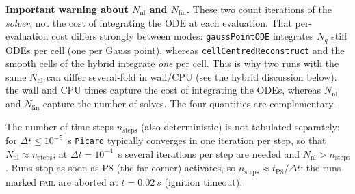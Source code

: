 \documentclass[11pt,a4paper]{article}
\newcommand{\code}[1]{\texttt{\small #1}}
\begin{document}
\noindent\textbf{Important warning about $N_{\mathrm{nl}}$ and $N_{\mathrm{lin}}$.}
These two count iterations of the \emph{solver}, not the cost of integrating the ODE at
each evaluation. That per-evaluation cost differs strongly between modes:
\code{gaussPointODE} integrates $N_q$ stiff ODEs per cell (one per Gauss point),
whereas \code{cellCentredReconstruct} and the smooth cells of the hybrid integrate
\emph{one} per cell. This is why two runs with the same $N_{\mathrm{nl}}$ can
differ several-fold in wall/CPU (see the hybrid discussion below): the
wall and CPU times capture the cost of integrating the ODEs, whereas
$N_{\mathrm{nl}}$ and $N_{\mathrm{lin}}$ capture the number of solves. The four
quantities are complementary.

The number of time steps $n_{\text{steps}}$ (also deterministic) is not tabulated
separately: for $\Delta t\le 10^{-5}$~s \code{Picard} typically converges in one
iteration per step, so that $N_{\mathrm{nl}}\approx n_{\text{steps}}$; at
$\Delta t=10^{-4}$~s several iterations per step are needed and
$N_{\mathrm{nl}}>n_{\text{steps}}$. Runs stop as soon as P8 (the far
corner) activates, so $n_{\text{steps}}\approx t_{\text{P8}}/\Delta t$; the
runs marked \textsc{fail} are aborted at $t=\SI{0.02}{s}$ (ignition timeout).

\end{document}
